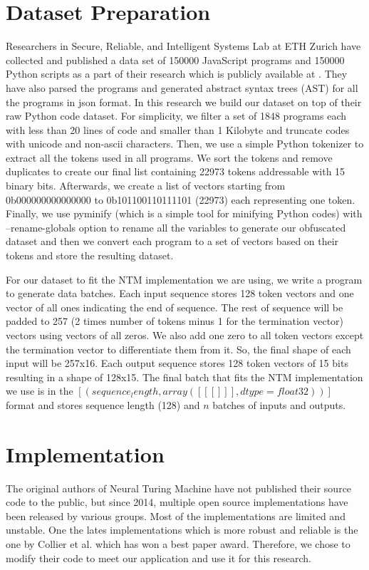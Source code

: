 \documentclass[acmsmall]{acmart}
\begin{document}
\section{Dataset Preparation}
Researchers in Secure, Reliable, and Intelligent Systems Lab at ETH Zurich have collected and published a data set of 150000 JavaScript programs and 150000 Python scripts as a part of their research \cite{jsnice} which is publicly available at \cite{bigcodedataset}. They have also parsed the programs and generated abstract syntax trees (AST) for all the programs in json format. In this research we build our dataset on top of their raw Python code dataset. For simplicity, we filter a set of 1848 programs each with less than 20 lines of code and smaller than 1 Kilobyte and truncate codes with unicode and non-ascii characters. Then, we use a simple Python tokenizer \cite{tokenizer} to extract all the tokens used in all programs. We sort the tokens and remove duplicates to create our final list containing 22973 tokens addressable with 15 binary bits. Afterwards, we create a list of vectors starting from 0b000000000000000 to 0b101100110111101 (22973) each representing one token. Finally, we use pyminify \cite{pyminify} (which is a simple tool for minifying Python codes) with --rename-globals option to rename all the variables to generate our obfuscated dataset and then we convert each program to a set of vectors based on their tokens and store the resulting dataset.

For our dataset to fit the NTM implementation we are using, we write a program to generate data batches. Each input sequence stores 128 token vectors and one vector of all ones indicating the end of sequence. The rest of sequence will be padded to 257 (2 times number of tokens minus 1 for the termination vector) vectors using vectors of all zeros. We also add one zero to all token vectors except the termination vector to differentiate them from it. So, the final shape of each input will be 257x16. Each output sequence stores 128 token vectors of 15 bits resulting in a shape of 128x15. The final batch that fits the NTM implementation we use is in the $[(sequence_length, array([[[]]], dtype=float32))]$ format and stores sequence length (128) and $n$ batches of inputs and outputs.
\section{Implementation}
The original authors of Neural Turing Machine have not published their source code to the public, but since 2014, multiple open source implementations have been released by various groups. Most of the implementations are limited and unstable. One the lates implementations which is more robust and reliable is the one by Collier et al. \cite{collier} which has won a best paper award. Therefore, we chose to modify their code to meet our application and use it for this research.
\end{document}
